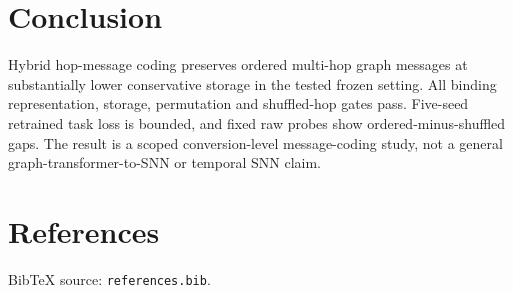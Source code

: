 \documentclass{article}
\begin{document}
\section{Conclusion}


Hybrid hop-message coding preserves ordered multi-hop graph messages at substantially lower conservative storage in the tested frozen setting. All binding representation, storage, permutation and shuffled-hop gates pass. Five-seed retrained task loss is bounded, and fixed raw probes show ordered-minus-shuffled gaps. The result is a scoped conversion-level message-coding study, not a general graph-transformer-to-SNN or temporal SNN claim.

\section*{References}


BibTeX source: \texttt{references.bib}.



\end{document}
